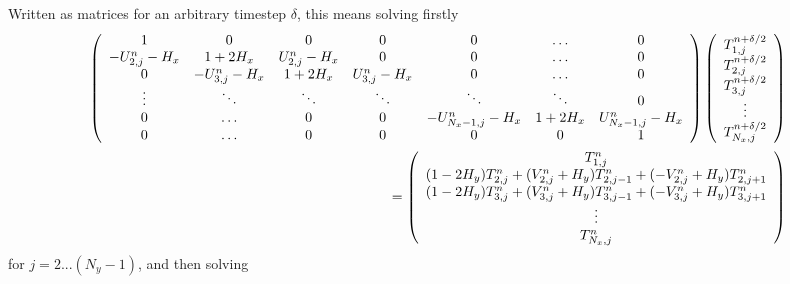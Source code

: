 \documentclass{article}
\begin{document}
Written as matrices for an arbitrary timestep $\delta$, this means solving firstly
\begin{eqnarray}
\left( \begin{array}{c c c c c c c}
1				&0					&0				&0				&0					&\hdots				&0	\\	
- U^{n}_{2,j} - H_x 	& 1+2 H_x				& U^{n}_{2,j} - H_x 	& 0 				& 0 					& \hdots 				& 0	\\
0				&- U^{n}_{3,j} - H_x 		& 1+2 H_x			& U^{n}_{3,j} - H_x 	& 0 					&\hdots  				& 0	\\
\vdots 			& \ddots 				& \ddots 			& \ddots 			& \ddots 				& \ddots 				& 0\\		
0 				& \hdots 				&0	 			& 0				& - U^{n}_{N_x-1,j} - H_x 	& 1+2 H_x  				& U^{n}_{N_x-1,j} - H_x	\\
0 				& \hdots 				&0	 			& 0				& 0 					& 0					& 1  
\end{array} \right) 
\left( \begin{array}{c}
T^{n+\delta/2}_{1,j}  \\
T^{n+\delta/2}_{2,j} \\
T^{n+\delta/2}_{3,j}  \\
\vdots \\
T^{n+\delta/2}_{N_x,j} \end{array} \right) 
\\ =
\left( \begin{array}{c}
 T^n_{1,j} \\
(1-2 H_y) T^n_{2,j} + (V^n_{2,j} + H_y) T^n_{2, j-1} + (-V^n_{2,j} + H_y) T^n_{2, j+1}   \\
(1-2 H_y) T^n_{3,j} + (V^n_{3,j} + H_y) T^n_{3, j-1} + (-V^n_{3,j} + H_y) T^n_{3, j+1}    \\
\vdots \\
T^n_{N_x,j} \end{array} \right) 
\end{eqnarray}
for $j = 2...(N_y-1)$, and then solving
\end{document}
